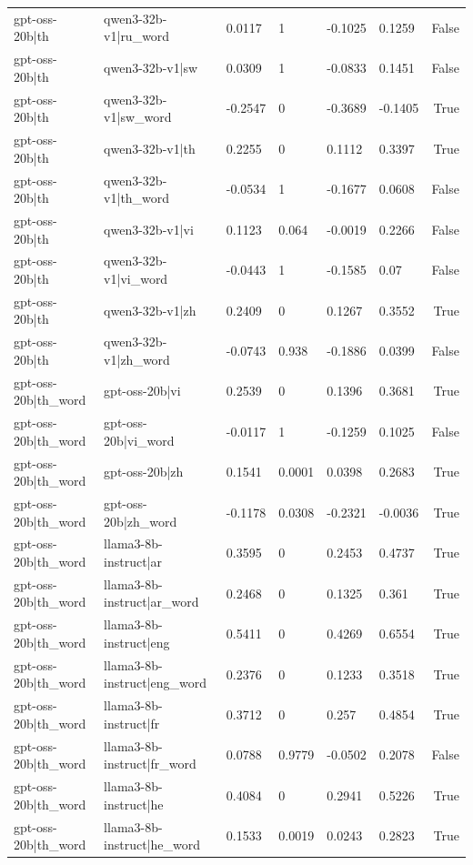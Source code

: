 \begin{table}
\begin{tabular}{llllllr}
gpt-oss-20b|th & qwen3-32b-v1|ru_word & 0.0117 & 1 & -0.1025 & 0.1259 & False \\
gpt-oss-20b|th & qwen3-32b-v1|sw & 0.0309 & 1 & -0.0833 & 0.1451 & False \\
gpt-oss-20b|th & qwen3-32b-v1|sw_word & -0.2547 & 0 & -0.3689 & -0.1405 & True \\
gpt-oss-20b|th & qwen3-32b-v1|th & 0.2255 & 0 & 0.1112 & 0.3397 & True \\
gpt-oss-20b|th & qwen3-32b-v1|th_word & -0.0534 & 1 & -0.1677 & 0.0608 & False \\
gpt-oss-20b|th & qwen3-32b-v1|vi & 0.1123 & 0.064 & -0.0019 & 0.2266 & False \\
gpt-oss-20b|th & qwen3-32b-v1|vi_word & -0.0443 & 1 & -0.1585 & 0.07 & False \\
gpt-oss-20b|th & qwen3-32b-v1|zh & 0.2409 & 0 & 0.1267 & 0.3552 & True \\
gpt-oss-20b|th & qwen3-32b-v1|zh_word & -0.0743 & 0.938 & -0.1886 & 0.0399 & False \\
gpt-oss-20b|th_word & gpt-oss-20b|vi & 0.2539 & 0 & 0.1396 & 0.3681 & True \\
gpt-oss-20b|th_word & gpt-oss-20b|vi_word & -0.0117 & 1 & -0.1259 & 0.1025 & False \\
gpt-oss-20b|th_word & gpt-oss-20b|zh & 0.1541 & 0.0001 & 0.0398 & 0.2683 & True \\
gpt-oss-20b|th_word & gpt-oss-20b|zh_word & -0.1178 & 0.0308 & -0.2321 & -0.0036 & True \\
gpt-oss-20b|th_word & llama3-8b-instruct|ar & 0.3595 & 0 & 0.2453 & 0.4737 & True \\
gpt-oss-20b|th_word & llama3-8b-instruct|ar_word & 0.2468 & 0 & 0.1325 & 0.361 & True \\
gpt-oss-20b|th_word & llama3-8b-instruct|eng & 0.5411 & 0 & 0.4269 & 0.6554 & True \\
gpt-oss-20b|th_word & llama3-8b-instruct|eng_word & 0.2376 & 0 & 0.1233 & 0.3518 & True \\
gpt-oss-20b|th_word & llama3-8b-instruct|fr & 0.3712 & 0 & 0.257 & 0.4854 & True \\
gpt-oss-20b|th_word & llama3-8b-instruct|fr_word & 0.0788 & 0.9779 & -0.0502 & 0.2078 & False \\
gpt-oss-20b|th_word & llama3-8b-instruct|he & 0.4084 & 0 & 0.2941 & 0.5226 & True \\
gpt-oss-20b|th_word & llama3-8b-instruct|he_word & 0.1533 & 0.0019 & 0.0243 & 0.2823 & True \\

\end{tabular}
\end{table}
